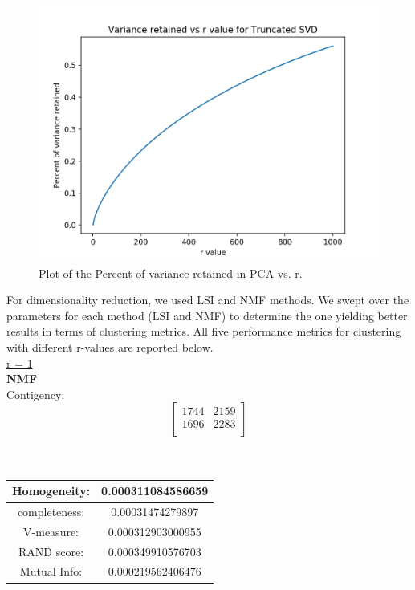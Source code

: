 \documentclass{report}
\begin{document}
\begin{figure}
  \includegraphics[width=\linewidth]{p3_variance_r.png}
  \caption{Plot of the Percent of variance retained in PCA vs. r.}
  \label{fig:variance_r}
\end{figure}

For dimensionality reduction, we used LSI and NMF methods. We swept over the parameters for each method (LSI and NMF) to determine the one yielding better results in terms of clustering metrics. All five performance metrics for clustering with different r-values are reported below. \\


\underline{r = 1} \\
\textbf{NMF} \\

Contigency: \[
\begin{bmatrix}
    1744       & 2159\\
    1696       & 2283\\
\end{bmatrix}
\]    
\\ \\

\begin{center}
\begin{tabu}{| c | c | }
\hline
Homogeneity: & 0.000311084586659 \\
\hline
completeness: & 0.00031474279897 \\
\hline
V-measure: & 0.000312903000955 \\
\hline
RAND score: & 0.000349910576703 \\
\hline
Mutual Info: & 0.000219562406476 \\
\hline
\end{tabu}
\end{center}
\end{document}
